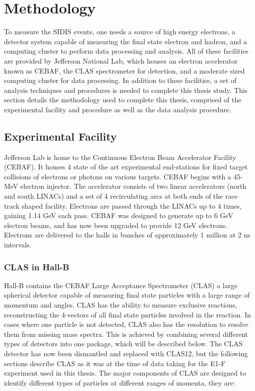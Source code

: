 \section{Methodology}
To measure the SIDIS events, one needs a source of high energy electrons, a detector system capable of measuring the final state electron and hadron, and a computing cluster to perform data processing and analysis.  All of these facilities are provided by Jefferson National Lab, which houses an electron accelerator known as CEBAF, the CLAS spectrometer for detection, and a moderate sized computing cluster for data processing.  In addition to these facilities, a set of analysis techniques and procedures is needed to complete this thesis study.  This section details the methodology used to complete this thesis, comprised of the experimental facility and procedure as well as the data analysis procedure.

\subsection{Experimental Facility}
Jefferson Lab is home to the Continuous Electron Beam Accelerator Facility (CEBAF).  It houses 4 state of the art experimental end-stations for fixed target collisions of electrons or photons on various targets.  CEBAF begins with a 45-MeV electron injector.  The accelerator consists of two linear accelerators (north and south LINACs) and a set of 4 recirculating arcs at both ends of the race track shaped facility.  Electrons are passed through the LINACs up to 4 times, gaining 1.14 GeV each pass.  CEBAF was designed to generate up to 6 GeV electron beams, and has now been upgraded to provide 12 GeV electrons. Electrons are delivered to the halls in bunches of approximately 1 million at 2 ns intervals.

\subsubsection{CLAS in Hall-B}
Hall-B contains the CEBAF Large Acceptance Spectrometer (CLAS) a large spherical detector capable of measuring final state particles with a large range of momentum and angles.  CLAS has the ability to measure exclusive reactions, reconstructing the 4-vectors of all final state particles involved in the reaction.  In cases where one particle is not detected, CLAS also has the resolution to resolve them from missing mass spectra.  This is achieved by combining several different types of detectors into one package, which will be described below.  The CLAS detector has now been dismantled and replaced with CLAS12, but the following sections describe CLAS as it was at the time of data taking for the E1-F experiment used in this thesis.  The major components of CLAS \cite{clas} are designed to identify different types of particles at different ranges of momenta, they are:

